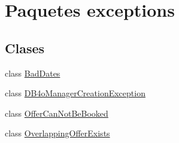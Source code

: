 \hypertarget{namespaceexceptions}{}\section{Paquetes exceptions}
\label{namespaceexceptions}
\subsection*{Clases}
\begin{DoxyCompactItemize}
\item 
class \mbox{\hyperlink{classexceptions_1_1_bad_dates}{Bad\+Dates}}
\item 
class \mbox{\hyperlink{classexceptions_1_1_d_b4o_manager_creation_exception}{D\+B4o\+Manager\+Creation\+Exception}}
\item 
class \mbox{\hyperlink{classexceptions_1_1_offer_can_not_be_booked}{Offer\+Can\+Not\+Be\+Booked}}
\item 
class \mbox{\hyperlink{classexceptions_1_1_overlapping_offer_exists}{Overlapping\+Offer\+Exists}}
\end{DoxyCompactItemize}
